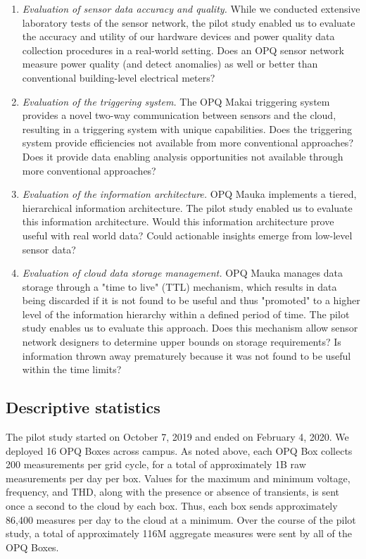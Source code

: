 \begin{enumerate}

\item {\em Evaluation of sensor data accuracy and quality.} While we conducted extensive laboratory tests of the sensor network, the pilot study enabled us to evaluate the accuracy and utility of our hardware devices and power quality data collection procedures in a real-world setting. Does an OPQ sensor network measure power quality (and detect anomalies) as well or better than conventional building-level electrical meters?

\item {\em Evaluation of the triggering system.} The OPQ Makai triggering system provides a novel two-way communication between sensors and the cloud, resulting in a triggering system with unique capabilities.  Does the triggering system provide efficiencies not available from more conventional approaches? Does it provide data enabling analysis opportunities not available through more conventional approaches?

\item {\em Evaluation of the information architecture.} OPQ Mauka implements a tiered, hierarchical information architecture.  The pilot study enabled us to evaluate this information architecture.  Would this information architecture prove useful with real world data? Could actionable insights emerge from low-level sensor data?

\item {\em Evaluation of cloud data storage management.} OPQ Mauka manages data storage through a "time to live" (TTL) mechanism, which results in data being discarded if it is not found to be useful and thus "promoted" to a higher level of the information hierarchy within a defined period of time.  The pilot study enables us to evaluate this approach. Does this mechanism allow sensor network designers to determine upper bounds on storage requirements? Is information thrown away prematurely because it was not found to be useful within the time limits?

\end{enumerate}

\subsection{Descriptive statistics}

The pilot study started on October 7, 2019 and ended on February 4, 2020. We deployed 16 OPQ Boxes across campus. As noted above, each OPQ Box collects 200 measurements per grid cycle, for a total of approximately 1B raw measurements per day per box.  Values for the maximum and minimum voltage, frequency, and THD, along with the presence or absence of transients, is sent once a second to the cloud by each box. Thus, each box sends approximately 86,400 measures per day to the cloud at a minimum. Over the course of the pilot study, a total of approximately 116M aggregate measures were sent by all of the OPQ Boxes.

